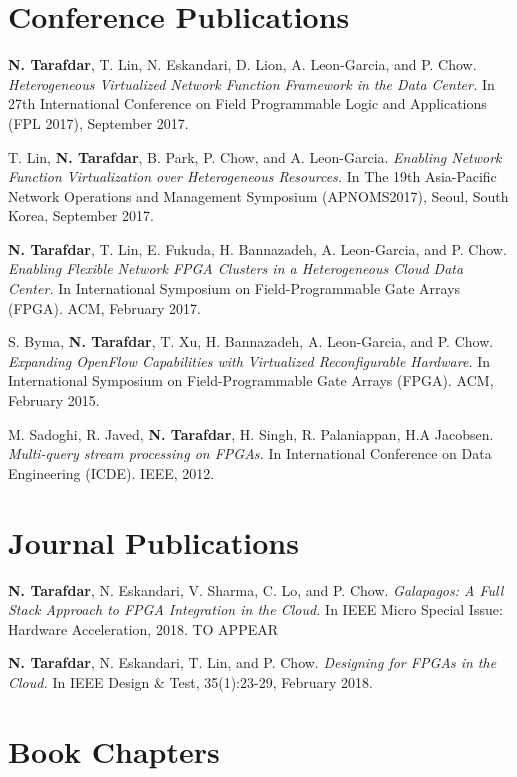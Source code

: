 

\section{\sc Conference Publications}

\onecol
{
  \textbf{N. Tarafdar}, T. Lin, N. Eskandari, D. Lion, A. Leon-Garcia, and P. Chow.
  \textit{Heterogeneous Virtualized Network Function Framework in the Data Center.}
  In 27th International Conference on Field Programmable Logic and Applications (FPL 2017), September 2017. 
}

\onecol
{
  T. Lin, \textbf{N. Tarafdar}, B. Park, P. Chow, and A. Leon-Garcia.
  \textit{Enabling Network Function Virtualization over Heterogeneous Resources.}
  In The 19th Asia-Pacific Network Operations and Management Symposium (APNOMS2017), Seoul, South Korea, September 2017. 
}


\onecol
{
    \textbf{N. Tarafdar}, T. Lin, E. Fukuda, H. Bannazadeh, A. Leon-Garcia, and P. Chow. 
  \textit{Enabling Flexible Network FPGA Clusters in a Heterogeneous Cloud Data Center.}
  In International Symposium on Field-Programmable Gate Arrays (FPGA). ACM, February 2017. 
}

\onecol
{
  S. Byma, \textbf{N. Tarafdar}, T. Xu, H. Bannazadeh, A. Leon-Garcia, and P. Chow. 
  \textit{Expanding OpenFlow Capabilities with Virtualized Reconfigurable Hardware.}
  In International Symposium on Field-Programmable Gate Arrays (FPGA). ACM, February 2015.
}

\onecol
{
    M. Sadoghi, R. Javed, \textbf{N. Tarafdar}, H. Singh, R. Palaniappan, H.A Jacobsen.
  \textit{Multi-query stream processing on FPGAs.}
  In International Conference on Data Engineering (ICDE). IEEE, 2012.
}

\section{\sc Journal Publications}

\onecol
{
  \textbf{N. Tarafdar}, N. Eskandari, V. Sharma, C. Lo, and P. Chow. 
  \textit{Galapagos: A Full Stack Approach to FPGA Integration in the Cloud.}
  In IEEE Micro Special Issue: Hardware Acceleration, 2018.
  TO APPEAR
}


\onecol
{
  \textbf{N. Tarafdar}, N. Eskandari, T. Lin, and P. Chow. 
  \textit{Designing for FPGAs in the Cloud.}
  In IEEE Design \& Test, 35(1):23-29, February 2018.
}


\section{\sc Book Chapters}

